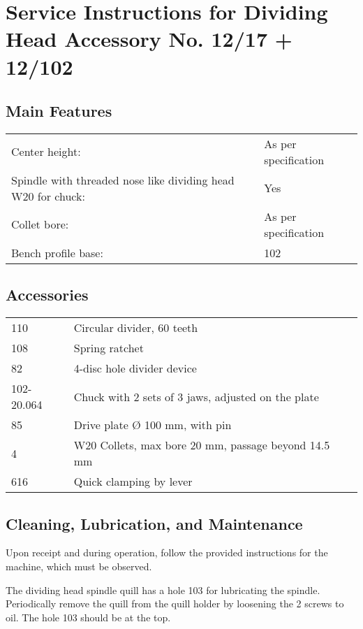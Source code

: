 \chapter{Service Instructions for Dividing Head \small{Accessory No. 12/17 + 12/102}}

\section*{Main Features}
\begin{tabular}{@{}ll@{}}
    Center height:                                               & As per specification \\
    Spindle with threaded nose like dividing head W20 for chuck: & Yes                  \\
    Collet bore:                                                 & As per specification \\
    Bench profile base:                                          & 102                  \\
\end{tabular}

\section*{Accessories}
\begin{tabular}{@{}ll@{}}
    110        & Circular divider, 60 teeth                          \\
    108        & Spring ratchet                                      \\
    82         & 4-disc hole divider device                          \\
    102-20.064 & Chuck with 2 sets of 3 jaws, adjusted on the plate  \\
    85         & Drive plate Ø 100 mm, with pin                      \\
    4          & W20 Collets, max bore 20 mm, passage beyond 14.5 mm \\
    616        & Quick clamping by lever
\end{tabular}

\section*{Cleaning, Lubrication, and Maintenance}
Upon receipt and during operation, follow the provided instructions for the machine, which must be observed.

The dividing head spindle quill has a hole 103 for lubricating the spindle.
Periodically remove the quill from the quill holder by loosening the 2 screws to oil. The hole 103 should be at the top.

